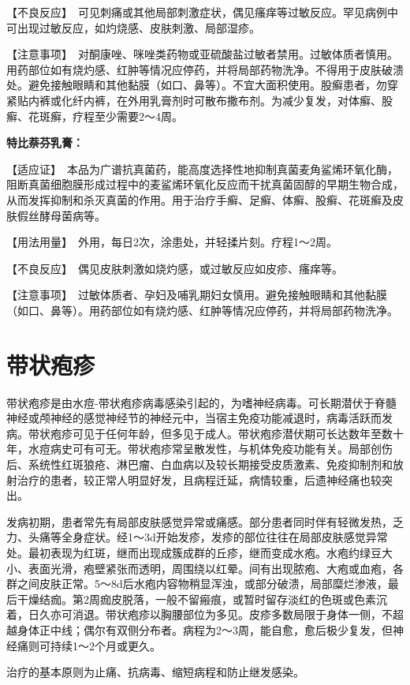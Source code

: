 【不良反应】　可见刺痛或其他局部刺激症状，偶见瘙痒等过敏反应。罕见病例中可出现过敏反应，如灼烧感、皮肤刺激、局部湿疹。

【注意事项】　对酮康唑、咪唑类药物或亚硫酸盐过敏者禁用。过敏体质者慎用。用药部位如有烧灼感、红肿等情况应停药，并将局部药物洗净。不得用于皮肤破溃处。避免接触眼睛和其他黏膜（如口、鼻等）。不宜大面积使用。股癣患者，勿穿紧贴内裤或化纤内裤，在外用乳膏剂时可散布撒布剂。为减少复发，对体癣、股癣、花斑癣，疗程至少需要2～4周。

\textbf{特比萘芬乳膏：}

【适应证】　本品为广谱抗真菌药，能高度选择性地抑制真菌麦角鲨烯环氧化酶，阻断真菌细胞膜形成过程中的麦鲨烯环氧化反应而干扰真菌固醇的早期生物合成，从而发挥抑制和杀灭真菌的作用。用于治疗手癣、足癣、体癣、股癣、花斑癣及皮肤假丝酵母菌病等。

【用法用量】　外用，每日2次，涂患处，并轻揉片刻。疗程1～2周。

【不良反应】　偶见皮肤刺激如烧灼感，或过敏反应如皮疹、瘙痒等。

【注意事项】　过敏体质者、孕妇及哺乳期妇女慎用。避免接触眼睛和其他黏膜（如口、鼻等）。用药部位如有烧灼感、红肿等情况应停药，并将局部药物洗净。

\section{带状疱疹}

带状疱疹是由水痘-带状疱疹病毒感染引起的，为嗜神经病毒。可长期潜伏于脊髓神经或颅神经的感觉神经节的神经元中，当宿主免疫功能减退时，病毒活跃而发病。带状疱疹可见于任何年龄，但多见于成人。带状疱疹潜伏期可长达数年至数十年，水痘病史可有可无。带状疱疹常呈散发性，与机体免疫功能有关。局部创伤后、系统性红斑狼疮、淋巴瘤、白血病以及较长期接受皮质激素、免疫抑制剂和放射治疗的患者，较正常人明显好发，且病程迁延，病情较重，后遗神经痛也较突出。

发病初期，患者常先有局部皮肤感觉异常或痛感。部分患者同时伴有轻微发热，乏力、头痛等全身症状。经1～3d开始发疹，发疹的部位往往在局部皮肤感觉异常处。最初表现为红斑，继而出现成簇成群的丘疹，继而变成水疱。水疱约绿豆大小、表面光滑，疱壁紧张而透明，周围绕以红晕。间有出现脓疱、大疱或血疱，各群之间皮肤正常。5～8d后水疱内容物稍显浑浊，或部分破溃，局部糜烂渗液，最后干燥结痂。第2周痂皮脱落，一般不留瘢痕，或暂时留存淡红的色斑或色素沉着，日久亦可消退。带状疱疹以胸腰部位为多见。皮疹多数局限于身体一侧，不超越身体正中线；偶尔有双侧分布者。病程为2～3周，能自愈，愈后极少复发，但神经痛则可持续1～2个月或更久。

治疗的基本原则为止痛、抗病毒、缩短病程和防止继发感染。

